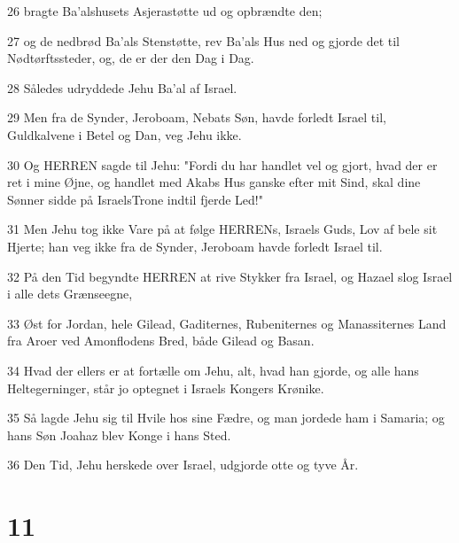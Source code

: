 \par 26 bragte Ba'alshusets Asjerastøtte ud og opbrændte den;
\par 27 og de nedbrød Ba'als Stenstøtte, rev Ba'als Hus ned og gjorde det til Nødtørftssteder, og, de er der den Dag i Dag.
\par 28 Således udryddede Jehu Ba'al af Israel.
\par 29 Men fra de Synder, Jeroboam, Nebats Søn, havde forledt Israel til, Guldkalvene i Betel og Dan, veg Jehu ikke.
\par 30 Og HERREN sagde til Jehu: "Fordi du har handlet vel og gjort, hvad der er ret i mine Øjne, og handlet med Akabs Hus ganske efter mit Sind, skal dine Sønner sidde på IsraelsTrone indtil fjerde Led!"
\par 31 Men Jehu tog ikke Vare på at følge HERRENs, Israels Guds, Lov af bele sit Hjerte; han veg ikke fra de Synder, Jeroboam havde forledt Israel til.
\par 32 På den Tid begyndte HERREN at rive Stykker fra Israel, og Hazael slog Israel i alle dets Grænseegne,
\par 33 Øst for Jordan, hele Gilead, Gaditernes, Rubeniternes og Manassiternes Land fra Aroer ved Amonflodens Bred, både Gilead og Basan.
\par 34 Hvad der ellers er at fortælle om Jehu, alt, hvad han gjorde, og alle hans Heltegerninger, står jo optegnet i Israels Kongers Krønike.
\par 35 Så lagde Jehu sig til Hvile hos sine Fædre, og man jordede ham i Samaria; og hans Søn Joahaz blev Konge i hans Sted.
\par 36 Den Tid, Jehu herskede over Israel, udgjorde otte og tyve År.

\chapter{11}

